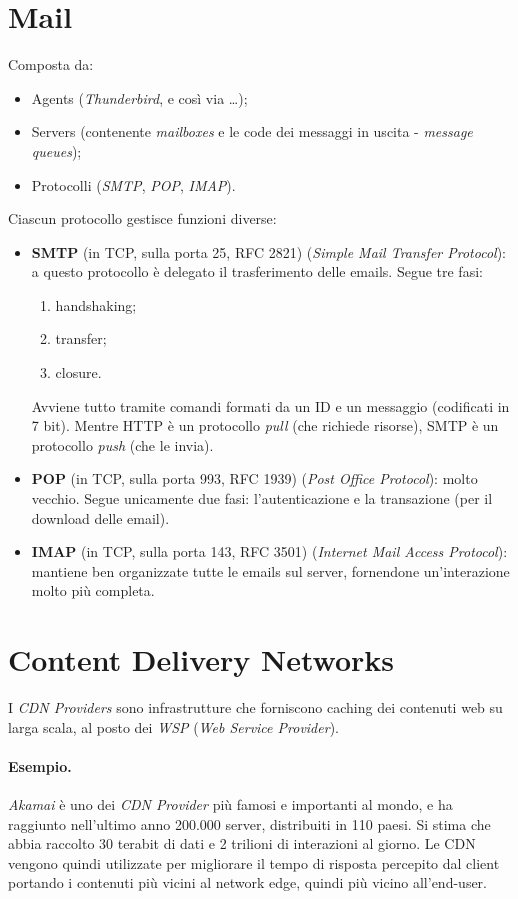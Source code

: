 \newpage

\section{Mail}
Composta da:
\begin{itemize}
    \item Agents (\textit{Thunderbird}, e così via \ldots);
    \item Servers (contenente \textit{mailboxes} e le code dei messaggi in uscita - \textit{message queues});
    \item Protocolli (\textit{SMTP}, \textit{POP}, \textit{IMAP}).
\end{itemize}
Ciascun protocollo gestisce funzioni diverse:
\begin{itemize}
    \item \textbf{SMTP} (in TCP, sulla porta 25, RFC 2821) (\textit{Simple Mail Transfer Protocol}): a questo protocollo è delegato il trasferimento delle emails. Segue tre fasi:
    \begin{enumerate}
        \item handshaking;
        \item transfer;
        \item closure.
    \end{enumerate}
    Avviene tutto tramite comandi formati da un ID e un messaggio (codificati in 7 bit). Mentre HTTP è un protocollo \textit{pull} (che richiede risorse), SMTP è un protocollo \textit{push} (che le invia).
    \item \textbf{POP} (in TCP, sulla porta 993, RFC 1939) (\textit{Post Office Protocol}): molto vecchio. Segue unicamente due fasi: l'autenticazione e la transazione (per il download delle email).
    \item \textbf{IMAP} (in TCP, sulla porta 143, RFC 3501) (\textit{Internet Mail Access Protocol}): mantiene ben organizzate tutte le emails sul server, fornendone  un'interazione molto più completa.
\end{itemize}


\section{Content Delivery Networks}
I \textit{CDN Providers} sono infrastrutture che forniscono caching dei contenuti web su larga scala, al posto dei \textit{WSP} (\textit{Web Service Provider}).
\paragraph{Esempio.}
\textit{Akamai} è uno dei \textit{CDN Provider} più famosi e importanti al mondo, e ha raggiunto nell'ultimo anno 200.000 server, distribuiti in 110 paesi. Si stima che abbia raccolto 30 terabit di dati e 2 trilioni di interazioni al giorno.
Le CDN vengono quindi utilizzate per migliorare il tempo di risposta percepito dal client portando i contenuti più vicini al network edge, quindi più vicino all'end-user. \\
\newpage

